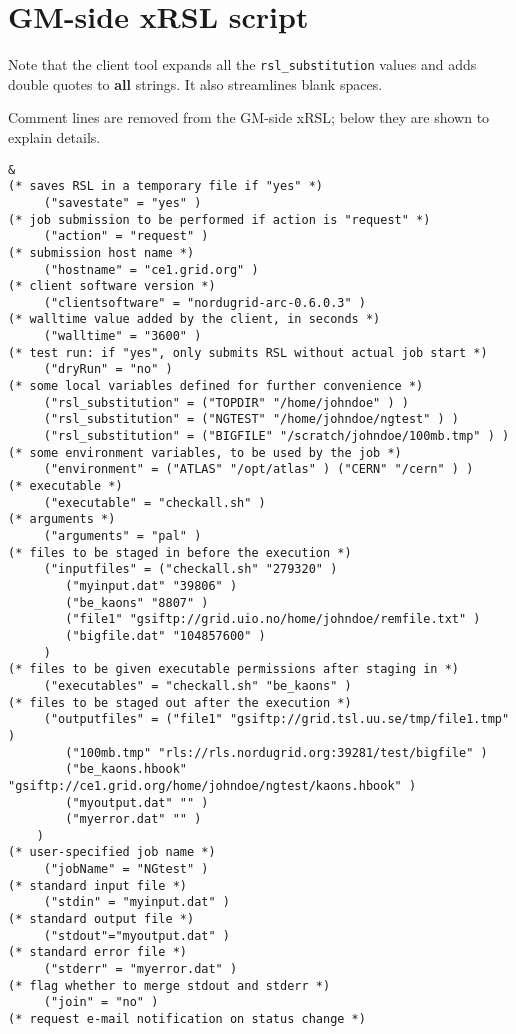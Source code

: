 \documentclass{book}
\begin{document}
  \section{GM-side xRSL script}

Note that the client tool expands all the \texttt{rsl\_substitution}
values and adds double quotes to \textbf{all} strings. It also
streamlines blank spaces.

Comment lines are removed from the GM-side xRSL; below they are shown
to explain details.

  \begin{verbatim}
&
(* saves RSL in a temporary file if "yes" *)
     ("savestate" = "yes" )
(* job submission to be performed if action is "request" *)
     ("action" = "request" )
(* submission host name *)
     ("hostname" = "ce1.grid.org" )
(* client software version *)
     ("clientsoftware" = "nordugrid-arc-0.6.0.3" )
(* walltime value added by the client, in seconds *)
     ("walltime" = "3600" )
(* test run: if "yes", only submits RSL without actual job start *)
     ("dryRun" = "no" )
(* some local variables defined for further convenience *)
     ("rsl_substitution" = ("TOPDIR" "/home/johndoe" ) ) 
     ("rsl_substitution" = ("NGTEST" "/home/johndoe/ngtest" ) )
     ("rsl_substitution" = ("BIGFILE" "/scratch/johndoe/100mb.tmp" ) )
(* some environment variables, to be used by the job *)
     ("environment" = ("ATLAS" "/opt/atlas" ) ("CERN" "/cern" ) )
(* executable *)
     ("executable" = "checkall.sh" )
(* arguments *)
     ("arguments" = "pal" )
(* files to be staged in before the execution *)
     ("inputfiles" = ("checkall.sh" "279320" )
        ("myinput.dat" "39806" )
        ("be_kaons" "8807" )
        ("file1" "gsiftp://grid.uio.no/home/johndoe/remfile.txt" ) 
        ("bigfile.dat" "104857600" )
     )
(* files to be given executable permissions after staging in *)
     ("executables" = "checkall.sh" "be_kaons" )
(* files to be staged out after the execution *)
     ("outputfiles" = ("file1" "gsiftp://grid.tsl.uu.se/tmp/file1.tmp" )
        ("100mb.tmp" "rls://rls.nordugrid.org:39281/test/bigfile" )
        ("be_kaons.hbook" "gsiftp://ce1.grid.org/home/johndoe/ngtest/kaons.hbook" )
        ("myoutput.dat" "" )
        ("myerror.dat" "" )
    )
(* user-specified job name *)
     ("jobName" = "NGtest" )
(* standard input file *)
     ("stdin" = "myinput.dat" )
(* standard output file *)
     ("stdout"="myoutput.dat" )
(* standard error file *)
     ("stderr" = "myerror.dat" )
(* flag whether to merge stdout and stderr *)
     ("join" = "no" )
(* request e-mail notification on status change *)

\end{verbatim}
\end{document}
